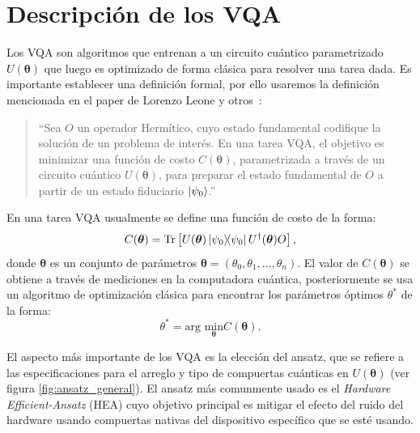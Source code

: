 \documentclass[letterpaper,12pt]{thesisECFM}
\theoremstyle{plain}
\theoremstyle{definition}
\theoremstyle{definition}
\theoremstyle{remark}
\newcommand{\1}{\mathbb{1}}
\begin{document}
\section{Descripción de los VQA} \label{sec:desc_vqa} %
Los VQA son algoritmos que entrenan a un circuito cuántico parametrizado
$U(\bm{\theta})$ que luego es optimizado de forma clásica para resolver una
tarea dada. Es importante establecer una definición formal, por ello usaremos
la definición mencionada en el paper de Lorenzo Leone y otros~\cite{HEA}:
\begin{quote}
\enquote{Sea $O$ un operador Hermítico, cuyo estado fundamental codifique la solución de un problema de interés. En una tarea VQA, el objetivo es minimizar una función de costo $C(\bm{\theta})$, parametrizada a través de un circuito cuántico $U(\bm{\theta})$, para preparar el estado fundamental de $O$ a partir de un estado fiduciario $\ket{\psi_0}$.}
\end{quote}
En una tarea VQA usualmente se define una función de costo de la forma:
\begin{equation}
    C(\bm{\theta}) =  \text{Tr} \left[U(\bm{\theta}) \ketbra{\psi_0}{\psi_0} U^{\dagger}(\bm{\theta}) O \right],
\end{equation}
donde $\bm{\theta}$ es un conjunto de parámetros $ \bm{\theta}= (\theta_0,\theta_1,...,\theta_n)$. 
El valor de $C(\bm{\theta})$ se obtiene a través de mediciones en la computadora cuántica, posteriormente se usa un algoritmo de optimización clásica para encontrar los parámetros óptimos $\theta^*$ de la forma:
\begin{equation}
\theta^* = \text{arg }\underset{\bm{\theta}} {\text{min}} C (\bm{\theta}).
\end{equation}

El aspecto más importante de los VQA es la elección del ansatz, que se refiere a las especificaciones para el arreglo y tipo de compuertas cuánticas en $U(\bm{\theta})$ (ver figura \ref{fig:ansatz_general}). El ansatz más comunmente usado es el \textit{Hardware Efficient-Ansatz} (HEA) cuyo objetivo principal es mitigar el efecto del ruido del hardware usando compuertas nativas del dispositivo específico que se esté usando.
\end{document}
